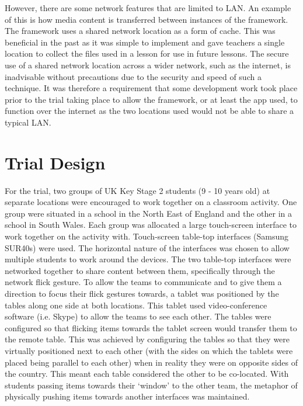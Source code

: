 \documentclass[a4paper,11pt]{article}
\begin{document}
However, there are some network features that are limited to LAN.
An example of this is how media content is transferred between instances of the framework.
The framework uses a shared network location as a form of cache.
This was beneficial in the past as it was simple to implement and gave teachers a single location to collect the files used in a lesson for use in future lessons.
The secure use of a shared network location across a wider network, such as the internet, is inadvisable without precautions due to the security and speed of such a technique.
It was therefore a requirement that some development work took place prior to the trial taking place to allow the framework, or at least the app used, to function over the internet as the two locations used would not be able to share a typical LAN.


\section{Trial Design}

For the trial, two groups of UK Key Stage 2 students (9 - 10 years old) at separate locations were encouraged to work together on a classroom activity.
One group were situated in a school in the North East of England and the other in a school in South Wales.
Each group was allocated a large touch-screen interface to work together on the activity with.
Touch-screen table-top interfaces (Samsung SUR40s) were used.
The horizontal nature of the interfaces was chosen to allow multiple students to work around the devices.
The two table-top interfaces were networked together to share content between them, specifically through the network flick gesture.
To allow the teams to communicate and to give them a direction to focus their flick gestures towards, a tablet was positioned by the tables along one side at both locations.
This tablet used video-conference software (i.e. Skype) to allow the teams to see each other.
The tables were configured so that flicking items towards the tablet screen would transfer them to the remote table.
This was achieved by configuring the tables so that they were virtually positioned next to each other (with the sides on which the tablets were placed being parallel to each other) when in reality they were on opposite sides of the country.
This meant each table considered the other to be co-located.
With students passing items towards their `window' to the other team, the metaphor of physically pushing items towards another interfaces was maintained.
\end{document}
